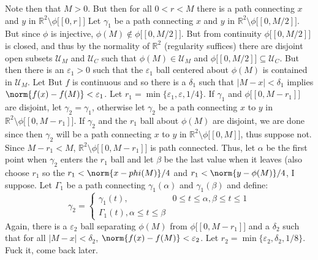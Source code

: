 \documentclass{article}                                                        %
\begin{document}
\begin{bproof}
        Note then that $M>0$. But then for all $0<r<M$ there is a path
        connecting $x$ and $y$ in $\mathbb{R}^{2}\setminus\phi\big[[0,r]\big]$
        Let $\gamma_{1}$ be a path connecting $x$ and $y$ in
        $\mathbb{R}^{2}\setminus\phi\big[[0,M/2]\big]$. But since $\phi$ is
        injective, $\phi(M)\notin\phi\big[[0,M/2]\big]$. But from continuity
        $\phi\big[[0,M/2]\big]$ is closed, and thus by the normality of
        $\mathbb{R}^{2}$ (regularity suffices) there are disjoint open subsets
        $\mathcal{U}_{M}$ and $\mathcal{U}_{C}$ such that
        $\phi(M)\in\mathcal{U}_{M}$ and
        $\phi\big[[0,M/2]\big]\subseteq\mathcal{U}_{C}$. But then there is an
        $\varepsilon_{1}>0$ such that the $\varepsilon_{1}$ ball centered about
        $\phi(M)$ is contained in $\mathcal{U}_{M}$. Let But $f$ is continuous
        and so there is a $\delta_{1}$ such that $|M-x|<\delta_{1}$ implies
        $\norm{f(x)-f(M)}<\varepsilon_{1}$. Let
        $r_{1}=\min\{\varepsilon_{1},\varepsilon,1/4\}$. If
        $\gamma_{1}$ and $\phi\big[[0,M-r_{1}]\big]$ are disjoint, let
        $\gamma_{2}=\gamma_{1}$, otherwise let $\gamma_{2}$ be a path connecting
        $x$ to $y$ in $\mathbb{R}^{2}\setminus\phi\big[[0,M-r_{1}]\big]$.
        If $\gamma_{2}$ and the $r_{1}$ ball about $\phi(M)$ are disjoint, we
        are done since then $\gamma_{2}$ will be a path connecting
        $x$ to $y$ in $\mathbb{R}^{2}\setminus\phi\big[[0,M]\big]$, thus
        suppose not. Since $M-r_{1}<M$,
        $\mathbb{R}^{2}\setminus\phi\big[[0,M-r_{1}]\big]$ is path connected.
        Thus, let $\alpha$ be the first point when $\gamma_{2}$ enters the
        $r_{1}$ ball and let $\beta$ be the last value when it leaves
        (also choose $r_{1}$ so the $r_{1}<\norm{x-phi(M)}/4$ and
        $r_{1}<\norm{y-\phi(M)}/4$, I suppose. Let $\Gamma_{1}$ be a path
        connecting $\gamma_{1}(\alpha)$ and $\gamma_{1}(\beta)$ and define:
        \begin{equation}
            \gamma_{2}=
            \begin{cases}
                \gamma_{1}(t),&0\leq{t}\leq\alpha,\beta\leq{t}\leq{1}\\
                \Gamma_{1}(t),\alpha\leq{t}\leq\beta
            \end{cases}
        \end{equation}
        Again, there is a $\varepsilon_{2}$ ball separating $\phi(M)$ from
        $\phi\big[[0,M-r_{1}]\big]$ and a $\delta_{2}$ such that for all
        $|M-x|<\delta_{2}$, $\norm{f(x)-f(M)}<\varepsilon_{2}$. Let
        $r_{2}=\min\{\varepsilon_{2},\delta_{2},1/8\}$. Fuck it, come back
        later.
    \end{bproof}
\end{document}
